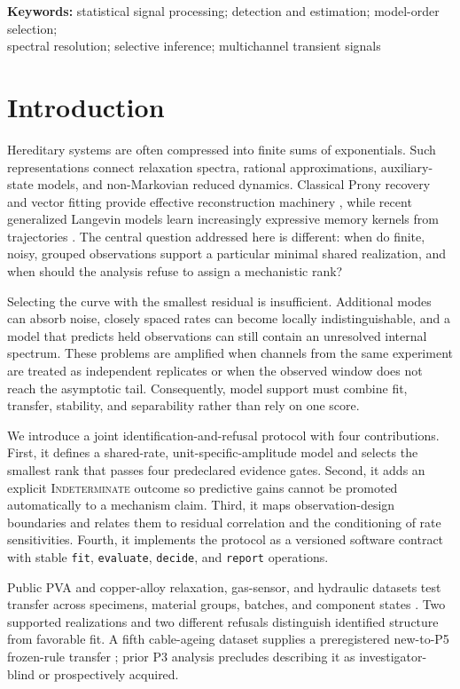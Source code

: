\documentclass[11pt]{article}
\newcommand{\indet}{\textsc{Indeterminate}}
\begin{document}
\noindent\textbf{Keywords:} statistical signal processing; detection and estimation; model-order selection;\\
spectral resolution; selective inference; multichannel transient signals

\section{Introduction}
Hereditary systems are often compressed into finite sums of exponentials. Such representations connect relaxation spectra, rational approximations, auxiliary-state models, and non-Markovian reduced dynamics. Classical Prony recovery and vector fitting provide effective reconstruction machinery \cite{stampfer2020gop,gustavsen1999vector,bosner2021parallel}, while recent generalized Langevin models learn increasingly expressive memory kernels from trajectories \cite{lei2016parameterization,ge2024state,lang2026learning}. The central question addressed here is different: when do finite, noisy, grouped observations support a particular minimal shared realization, and when should the analysis refuse to assign a mechanistic rank?

Selecting the curve with the smallest residual is insufficient. Additional modes can absorb noise, closely spaced rates can become locally indistinguishable, and a model that predicts held observations can still contain an unresolved internal spectrum. These problems are amplified when channels from the same experiment are treated as independent replicates or when the observed window does not reach the asymptotic tail. Consequently, model support must combine fit, transfer, stability, and separability rather than rely on one score.

We introduce a joint identification-and-refusal protocol with four contributions. First, it defines a shared-rate, unit-specific-amplitude model and selects the smallest rank that passes four predeclared evidence gates. Second, it adds an explicit \indet{} outcome so predictive gains cannot be promoted automatically to a mechanism claim. Third, it maps observation-design boundaries and relates them to residual correlation and the conditioning of rate sensitivities. Fourth, it implements the protocol as a versioned software contract with stable \texttt{fit}, \texttt{evaluate}, \texttt{decide}, and \texttt{report} operations.

Public PVA and copper-alloy relaxation, gas-sensor, and hydraulic datasets test transfer across specimens, material groups, batches, and component states \cite{schelkow2026pva,kupferdigital2024relaxation,ziyatdinov2015dataset,ziyatdinov2015bioinspired,helwig2018hydraulic}. Two supported realizations and two different refusals distinguish identified structure from favorable fit. A fifth cable-ageing dataset supplies a preregistered new-to-P5 frozen-rule transfer \cite{kayanja2026cableageing}; prior P3 analysis precludes describing it as investigator-blind or prospectively acquired.
\end{document}
